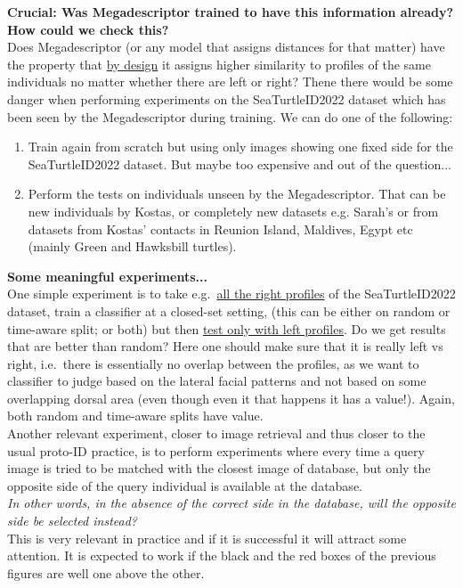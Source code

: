 \documentclass[11pt, twoside]{article}
\begin{document}
\noindent
\textbf{Crucial: Was Megadescriptor  trained to have this information already? How could we check this?}\\
Does Megadescriptor (or any model that assigns distances for that matter) have the property that \underline{by design} it assigns higher similarity to profiles of the same individuals no matter whether there are left or right? Thene there would be some danger when performing experiments on the SeaTurtleID2022 dataset which has been seen by the Megadescriptor during training.
We can do one of the following:
\begin{enumerate}
\item Train again from scratch but using only images showing one fixed side for the SeaTurtleID2022 dataset. But maybe too expensive and out of the question...
\item Perform the tests on individuals unseen by the Megadescriptor. That can be new individuals by Kostas, or completely new datasets e.g. Sarah's or from datasets from Kostas' contacts in Reunion Island, Maldives, Egypt etc (mainly Green and Hawksbill turtles).
\end{enumerate}


\noindent
\textbf{Some meaningful experiments...}\\
One simple experiment is to take e.g.\ \underline{all the right profiles} of the SeaTurtleID2022 dataset, train a classifier at a closed-set setting, (this can be either on random or time-aware split; or both) but then \underline{test only with left profiles}. Do we get results that are better than random? Here one should make sure that it is really left vs right, i.e.\ there is essentially no overlap between the profiles, as we want to classifier to judge based on the lateral facial patterns and not based on some overlapping dorsal area (even though even it that happens it has a value!). Again, both random and time-aware splits have value.\\

\noindent
Another relevant experiment, closer to image retrieval and thus closer to the usual proto-ID practice, is to perform experiments where every time a query image is tried to be matched with the closest image of database, but only the opposite side of the query individual is available at the database. \\[0.2em]
\emph{In other words, in the absence of the correct side in the database, will the opposite side be selected instead?}\\[0.2em]
This is very relevant in practice and if it is successful it will attract some attention. It is expected to work if the black and the red boxes of the previous figures are well one above the other.\\
\end{document}
